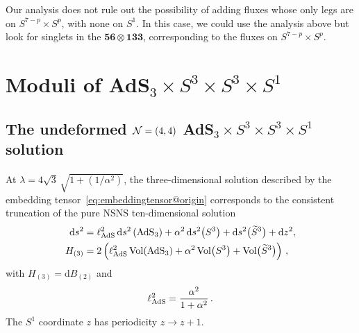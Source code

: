 \documentclass[a4paper, 11pt]{article}
\numberwithin{equation}{section}
\newcommand{\ts}[1]{\widetilde{#1}}
\newcommand{\+}{\oplus}
\renewcommand{\d}{\ensuremath{\mathrm{d}}\xspace}
\begin{document}
Our analysis does not rule out the possibility of adding fluxes whose only legs are on $S^{7-p} \times S^p$, with none on $S^1$. In this case, we could use the analysis above but look for singlets in the $\mathbf{56} \otimes \mathbf{133}$, corresponding to the fluxes on $S^{7-p} \times S^p$.

\section{Moduli of \texorpdfstring{AdS$_3 \times S^3 \times S^3 \times S^1$}{AdS3xS3xS3xS1}} \label{s:Moduli}

\subsection{The undeformed ${\cal N}=(4,4)$ AdS$_3 \times S^3 \times S^3 \times S^1$ solution}
\paragraph{} At $\lambda=4\sqrt{3}\,\sqrt{1+(1/\alpha^{2})}$, the three-dimensional solution described by the embedding tensor~\eqref{eq:embeddingtensor@origin} corresponds to the consistent truncation of the pure NSNS ten-dimensional solution~\cite{deBoer:1999gea}
\begin{equation} \label{eq:AdS3}
	\begin{split}
		\d s^{2} &= \ell_{\rm AdS}^{2}\,\d s^{2}\left({\rm AdS}_{3}\right) + \alpha^{2}\,\d s^{2}\big(S^{3}\big)+\d s^{2}\big(\ts{S}^{3}\big)+\d z^{2},\\
		H_{(3)} &= 2\left(\ell_{\rm AdS}^{2}\,{\rm Vol}({\rm AdS_{3}})+\alpha^{2}\,{\rm Vol}\big(S^{3}\big)+{\rm Vol}\big(\ts{S}^{3}\big)\right)\,,
	\end{split}
\end{equation}
with $H_{(3)} = \d B_{(2)}$ and
\begin{equation}
	\ell_{\rm AdS}^{2} = \frac{\alpha^{2}}{1+\alpha^{2}}\,.
\end{equation}
The $S^{1}$ coordinate $z$ has periodicity $z\rightarrow z+1$.
\end{document}
